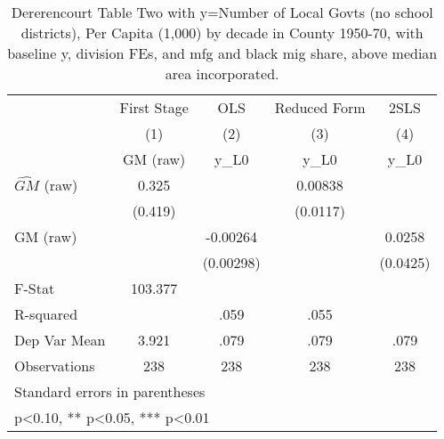 \begin{table}[htbp]\centering
\def\sym#1{\ifmmode^{#1}\else\(^{#1}\)\fi}
\caption{Dererencourt Table Two with y=Number of Local Govts (no school districts), Per Capita (1,000) by decade in County 1950-70, with baseline y, division FEs, and mfg and black mig share, above median area incorporated.}
\begin{tabular}{l*{4}{c}}
\toprule
                    & First Stage   &         OLS   &Reduced Form   &        2SLS   \\
                    &\multicolumn{1}{c}{(1)}&\multicolumn{1}{c}{(2)}&\multicolumn{1}{c}{(3)}&\multicolumn{1}{c}{(4)}\\
                    &\multicolumn{1}{c}{GM  (raw)}&\multicolumn{1}{c}{y\_L0}&\multicolumn{1}{c}{y\_L0}&\multicolumn{1}{c}{y\_L0}\\
\midrule
$\hat{GM}$ (raw)    &       0.325   &               &     0.00838   &               \\
                    &     (0.419)   &               &    (0.0117)   &               \\
\addlinespace
GM  (raw)           &               &    -0.00264   &               &      0.0258   \\
                    &               &   (0.00298)   &               &    (0.0425)   \\
\midrule
F-Stat              &     103.377   &               &               &               \\
R-squared           &               &        .059   &        .055   &               \\
Dep Var Mean        &       3.921   &        .079   &        .079   &        .079   \\
Observations        &         238   &         238   &         238   &         238   \\
\bottomrule
\multicolumn{5}{l}{\footnotesize Standard errors in parentheses}\\
\multicolumn{5}{l}{\footnotesize * p<0.10, ** p<0.05, *** p<0.01}\\
\end{tabular}
\end{table}
